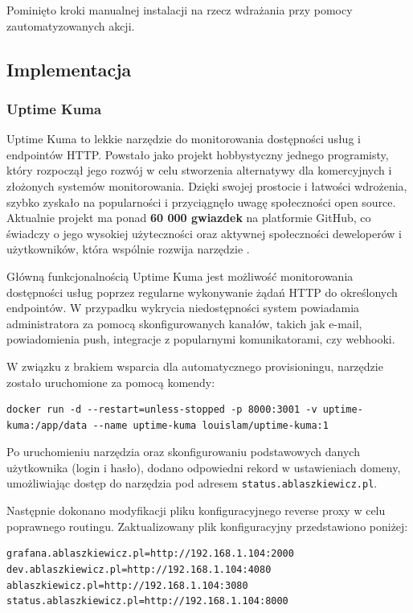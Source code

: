 \documentclass{article}
\begin{document}
Pominięto kroki manualnej instalacji na rzecz wdrażania przy pomocy zautomatyzowanych akcji.

\subsection{Implementacja}

\subsubsection{Uptime Kuma}

Uptime Kuma to lekkie narzędzie do monitorowania dostępności usług i endpointów HTTP. Powstało jako projekt hobbystyczny jednego programisty, który rozpoczął jego rozwój w celu stworzenia alternatywy dla komercyjnych i złożonych systemów monitorowania. Dzięki swojej prostocie i łatwości wdrożenia, szybko zyskało na popularności i przyciągnęło uwagę społeczności open source. Aktualnie projekt ma ponad \textbf{60 000 gwiazdek} na platformie GitHub, co świadczy o jego wysokiej użyteczności oraz aktywnej społeczności deweloperów i użytkowników, która wspólnie rozwija narzędzie \cite{UptimeKumaGithub}.

Główną funkcjonalnością Uptime Kuma jest możliwość monitorowania dostępności usług poprzez regularne wykonywanie żądań HTTP do określonych endpointów. W przypadku wykrycia niedostępności system powiadamia administratora za pomocą skonfigurowanych kanałów, takich jak e-mail, powiadomienia push, integracje z popularnymi komunikatorami, czy webhooki.

W związku z brakiem wsparcia dla automatycznego provisioningu, narzędzie zostało uruchomione za pomocą komendy:

\begin{lstlisting}[caption=Komenda użyta do uruchomienia Uptime Kuma, label=lst:uptime-kuma-run]
docker run -d --restart=unless-stopped -p 8000:3001 -v uptime-kuma:/app/data --name uptime-kuma louislam/uptime-kuma:1
\end{lstlisting}

Po uruchomieniu narzędzia oraz skonfigurowaniu podstawowych danych użytkownika (login i hasło), dodano odpowiedni rekord w ustawieniach domeny, umożliwiając dostęp do narzędzia pod adresem \texttt{status.ablaszkiewicz.pl}. 

Następnie dokonano modyfikacji pliku konfiguracyjnego reverse proxy w celu poprawnego routingu. Zaktualizowany plik konfiguracyjny przedstawiono poniżej:

\begin{lstlisting}[caption=Zmodyfikowany plik konfiguracyjny reverse proxy, label=lst:reverse-proxy-config]
grafana.ablaszkiewicz.pl=http://192.168.1.104:2000
dev.ablaszkiewicz.pl=http://192.168.1.104:4080
ablaszkiewicz.pl=http://192.168.1.104:3080
status.ablaszkiewicz.pl=http://192.168.1.104:8000
\end{lstlisting}
\end{document}
